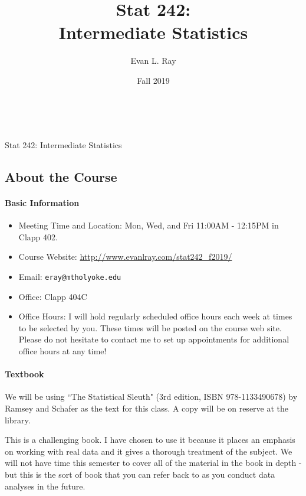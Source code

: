 \documentclass[11pt]{article}
\title{Stat 242:\\ Intermediate Statistics}
\author{Evan L. Ray}
\date{Fall 2019}
\begin{document}
	
	\ \\
	\vspace{.01in}
	\begin{center}
		{\large Stat 242: Intermediate Statistics}
	\end{center}
	\subsection*{About the Course}
	
	\paragraph{Basic Information}
	
	\begin{itemize}
		\item Meeting Time and Location: Mon, Wed, and Fri 11:00AM - 12:15PM in Clapp 402.
		\item Course Website: \url{http://www.evanlray.com/stat242_f2019/}
		\item Email: \texttt{eray@mtholyoke.edu}
		\item Office: Clapp 404C
		\item Office Hours: I will hold regularly scheduled office hours each week at times to be selected by you.  These times will be posted on the course web site.  Please do not hesitate to contact me to set up appointments for additional office hours at any time!
	\end{itemize}
	
	\paragraph{Textbook}
	
	We will be using ``The Statistical Sleuth" (3rd edition, ISBN 978-1133490678) by Ramsey and Schafer as the text for this class.  A copy will be on reserve at the library.
	
	This is a challenging book.  I have chosen to use it because it places an emphasis on working with real data and it gives a thorough treatment of the subject.  We will not have time this semester to cover all of the material in the book in depth - but this is the sort of book that you can refer back to as you conduct data analyses in the future.
	
\end{document}
